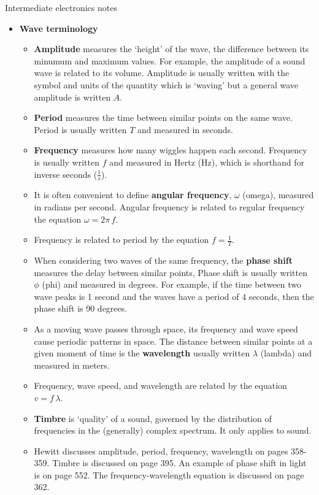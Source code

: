 \documentclass{article}
\begin{document}
\begin{center}
  \Huge{Intermediate electronics notes}
\end{center}
\begin{itemize}

\item \textbf{Wave terminology}
  \begin{itemize}
    \item \textbf{Amplitude} measures the `height' of the wave, the difference
          between its minumum and maximum values. For example, the amplitude 
          of a sound wave is related to its volume. Amplitude is usually 
          written with the symbol and units of the quantity which is `waving' 
          but a general wave amplitude is written $A$.
    \item \textbf{Period} measures the time between similar points on the same
          wave. Period is usually written $T$ and measured in seconds.
    \item \textbf{Frequency} measures how many wiggles happen each second.
          Frequency is usually written $f$ and measured in Hertz (Hz), which
          is shorthand for inverse seconds ($\frac{1}{s}$).
    \item It is often convenient to define \textbf{angular frequency}, $\omega$
          (omega), measured in radians per second. Angular frequency is
          related to regular frequency the equation $\omega = 2\pi\,f$.
    \item Frequency is related to period by the equation $f=\frac{1}{T}$. 
    \item When considering two waves of the same frequency, the 
          \textbf{phase shift} measures the delay between similar points,
          Phase shift is usually written $\phi$ (phi) and measured in degrees.
          For example, if the time between two wave peaks is 1 second and the 
          waves have a period of 4 seconds, then the phase shift is 90 degrees.
    \item As a moving wave passes through space, its frequency and wave speed
          cause periodic patterns in space. The distance between similar points
          at a given moment of time is the \textbf{wavelength} usually written
          $\lambda$ (lambda) and measured in meters.
    \item Frequency, wave speed, and wavelength are related by the equation
          $v = f\,\lambda$.
    \item \textbf{Timbre} is `quality' of a sound, governed by the distribution
          of frequencies in the (generally) complex spectrum. It only applies
          to sound.
    \item Hewitt discusses amplitude, period, frequency, wavelength on pages 
          358-359. Timbre is discussed on page 395. An example of phase shift
          in light is on page 552. The frequency-wavelength equation is 
          discussed on page 362.
  \end{itemize}


\end{itemize}
\end{document}
